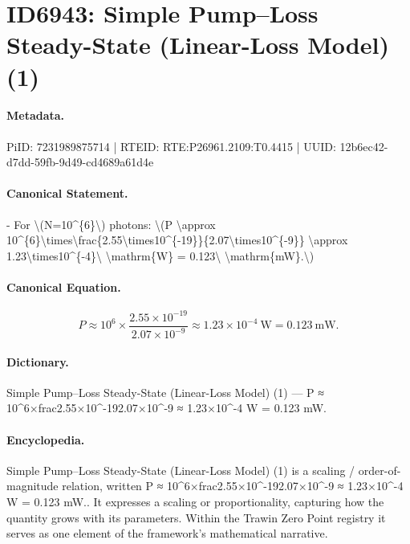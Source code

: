 \section*{ID6943: Simple Pump–Loss Steady-State (Linear-Loss Model) (1)}
\paragraph{Metadata.}
PiID: 7231989875714 | RTEID: RTE:P26961.2109:T0.4415 | UUID: 12b6ec42-d7dd-59fb-9d49-cd4689a61d4e

\paragraph{Canonical Statement.}
- For \textbackslash{}(N=10\textasciicircum{}\{6\}\textbackslash{}) photons: \textbackslash{}(P \textbackslash{}approx 10\textasciicircum{}\{6\}\textbackslash{}times\textbackslash{}frac\{2.55\textbackslash{}times10\textasciicircum{}\{-19\}\}\{2.07\textbackslash{}times10\textasciicircum{}\{-9\}\} \textbackslash{}approx 1.23\textbackslash{}times10\textasciicircum{}\{-4\}\textbackslash{} \textbackslash{}mathrm\{W\} = 0.123\textbackslash{} \textbackslash{}mathrm\{mW\}.\textbackslash{})

\paragraph{Canonical Equation.}
\[
P \approx 10^{6}\times\frac{2.55\times10^{-19}}{2.07\times10^{-9}} \approx 1.23\times10^{-4}\ \mathrm{W} = 0.123\ \mathrm{mW}.
\]

\paragraph{Dictionary.}
Simple Pump–Loss Steady-State (Linear-Loss Model) (1) — P ≈ 10\textasciicircum{}6×frac2.55×10\textasciicircum{}-192.07×10\textasciicircum{}-9 ≈ 1.23×10\textasciicircum{}-4 W = 0.123 mW.

\paragraph{Encyclopedia.}
Simple Pump–Loss Steady-State (Linear-Loss Model) (1) is a scaling / order-of-magnitude relation, written P ≈ 10\textasciicircum{}6×frac2.55×10\textasciicircum{}-192.07×10\textasciicircum{}-9 ≈ 1.23×10\textasciicircum{}-4 W = 0.123 mW.. It expresses a scaling or proportionality, capturing how the quantity grows with its parameters. Within the Trawin Zero Point registry it serves as one element of the framework's mathematical narrative.
